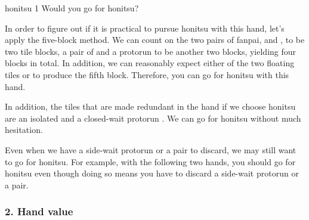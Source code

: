 \begin{itembox}[r]{{\jap honitsu} 1}
\bp
{}\dong\dong\xi\zhong\zhong
\ep
\vspace{-10pt}Would you go for {\jap honitsu}? \vspace{-5pt}
\end{itembox}
\noindent
In order to figure out if it is practical to pursue {\jap honitsu} with this hand, let's apply the five-block method. 
\emj
We can count on the two pairs of {\jap fanpai}, {\large\dong\dong} and {\large\zhong\zhong}, to be two tile blocks, a pair of {\large{}} and a protorun {\large{}} to be another two blocks, yielding four blocks in total. In addition, we can reasonably expect either of the two floating tiles {\large\xi} or {\large{}} to produce the fifth block. Therefore, you can go for {\jap honitsu} with this hand. 

\bigskip
In addition, the tiles that are made redundant in the hand if we choose {\jap honitsu} are an isolated {\large{}} and a closed-wait protorun {\large{}}. We can go for {\jap honitsu} without much hesitation. 

\bigskip
Even when we have a side-wait protorun or a pair to discard, we may still want to go for {\jap honitsu}. For example, with the following two hands, you should go for {\jap honitsu} even though doing so means you have to discard a side-wait protorun or a pair. 
\bp
{}\xi\bai\bai\bai\\
\dong\nan\nan\bei\zhong
\ep

\subsubsection{2. Hand value}

